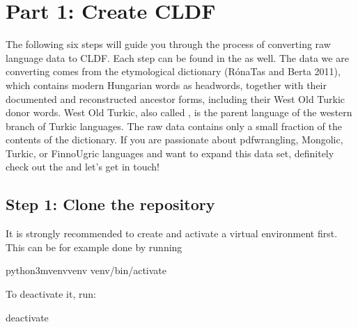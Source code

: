 \documentclass[letterpaper,10pt,english]{sphinxmanual}
\begin{document}
{{{{\chapter{Part 1: Create CLDF}
\label{\detokenize{mkcldf:part-1-create-cldf}}\label{\detokenize{mkcldf::doc}}
\sphinxAtStartPar
The following six steps will guide you through the process of
converting raw language data to CLDF. Each step can be found in the
as well. The data we are converting comes from the etymological dictionary
(Róna\sphinxhyphen{}Tas and Berta 2011),
which contains modern Hungarian words as headwords, together with their
documented and reconstructed ancestor forms, including their
West Old Turkic donor words. West Old Turkic, also called , is the parent
language of the western branch
of Turkic languages. The raw data contains only a small fraction of the
contents of the dictionary. If you are passionate about pdf\sphinxhyphen{}wrangling,
Mongolic, Turkic, or Finno\sphinxhyphen{}Ugric languages and want to expand this data set,
definitely check out the 
and let’s get in touch!


\section{Step 1: Clone the repository}
\label{\detokenize{mkcldf:step-1-clone-the-repository}}
\sphinxAtStartPar
It is strongly recommended to create and activate a virtual environment first.
This can be for example done by running

\begin{sphinxVerbatim}[commandchars=\\\{\}]
python3\PYGZhy{}mvenvvenv
venv/bin/activate
\end{sphinxVerbatim}

\sphinxAtStartPar
To deactivate it, run:

\begin{sphinxVerbatim}[commandchars=\\\{\}]
deactivate
\end{sphinxVerbatim}

}}}}
\end{document}
